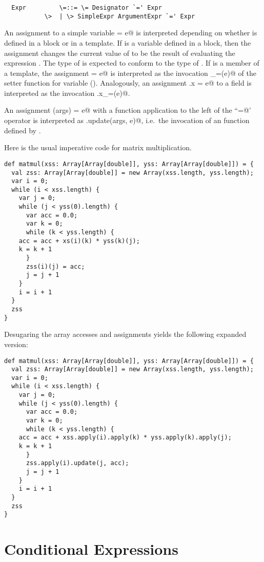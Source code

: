 \documentclass[11pt]{report}
\begin{document}
\syntax\begin{verbatim}
  Expr	       \=::= \= Designator `=' Expr
	       \>  | \> SimpleExpr ArgumentExpr `=' Expr
\end{verbatim}

An assignment to a simple variable \verb@x = e@ is interpreted
depending on whether \verb@x@ is defined in a block or in a
template. If \verb@x@ is a variable defined in a block, then the
assignment changes the current value of \verb@x@ to be the result of
evaluating the expression \verb@e@. The type of \verb@e@ is expected
to conform to the type of \verb@x@.  If \verb@x@ is a member
of a template, the assignment \verb@x = e@ is interpreted as the
invocation \verb@x_=(e)@ of the setter function for variable \verb@x@
().  Analogously, an assignment \verb@f.x = e@ to a
field \verb@x@ is interpreted as the invocation \verb@f.x_=(e)@.

An assignment \verb@f(args) = e@ with a function application to the
left of the ``\verb@=@' operator is interpreted as 
\verb@f.update(args, e)@, i.e.\
the invocation of an \verb@update@ function defined by \verb@f@.

\example \label{ex:imp-mat-mul}
Here is the usual imperative code for matrix multiplication.

\begin{verbatim}
def matmul(xss: Array[Array[double]], yss: Array[Array[double]]) = {
  val zss: Array[Array[double]] = new Array(xss.length, yss.length);
  var i = 0;
  while (i < xss.length) {
    var j = 0;
    while (j < yss(0).length) {
      var acc = 0.0;
      var k = 0;
      while (k < yss.length) {
	acc = acc + xs(i)(k) * yss(k)(j);
	k = k + 1
      }
      zss(i)(j) = acc;
      j = j + 1
    }
    i = i + 1
  }
  zss
}
\end{verbatim}
Desugaring the array accesses and assignments yields the following
expanded version:
\begin{verbatim}
def matmul(xss: Array[Array[double]], yss: Array[Array[double]]) = {
  val zss: Array[Array[double]] = new Array(xss.length, yss.length);
  var i = 0;
  while (i < xss.length) {
    var j = 0;
    while (j < yss(0).length) {
      var acc = 0.0;
      var k = 0;
      while (k < yss.length) {
	acc = acc + xss.apply(i).apply(k) * yss.apply(k).apply(j);
	k = k + 1
      }
      zss.apply(i).update(j, acc);
      j = j + 1
    }
    i = i + 1
  }
  zss
}
\end{verbatim}

\section{Conditional Expressions}
\end{document}
